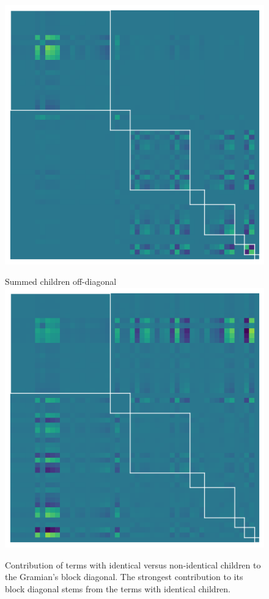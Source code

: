 \begin{figure}
\begin{minipage}[t]{0.325\linewidth}
    \includegraphics[width=\linewidth]{../kfac_pinns_exp/exp04_gramian_contributions/fig/gram_diag_children.png}
  \end{minipage}
  \hfill
  \begin{minipage}[t]{0.325\linewidth}
    \centering
    Summed children off-diagonal
    \includegraphics[width=\linewidth]{../kfac_pinns_exp/exp04_gramian_contributions/fig/gram_offdiag_children.png}
  \end{minipage}
  \caption{Contribution of terms with identical versus non-identical children to the Gramian's block diagonal.
    The strongest contribution to its block diagonal stems from the terms with identical children.}\label{fig:gramian-contribution-summed-children}
\end{figure}
